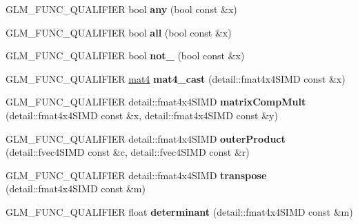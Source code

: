\begin{DoxyCompactItemize}
\item 
G\+L\+M\+\_\+\+F\+U\+N\+C\+\_\+\+Q\+U\+A\+L\+I\+F\+I\+ER bool {\bfseries any} (bool const \&x)\hypertarget{namespaceglm_ad41a7e46efe59ecfa701a0d561b7e8fa}{}\label{namespaceglm_ad41a7e46efe59ecfa701a0d561b7e8fa}

\item 
G\+L\+M\+\_\+\+F\+U\+N\+C\+\_\+\+Q\+U\+A\+L\+I\+F\+I\+ER bool {\bfseries all} (bool const \&x)\hypertarget{namespaceglm_a55c4531f4a0de48f87a20702d96d4289}{}\label{namespaceglm_a55c4531f4a0de48f87a20702d96d4289}

\item 
G\+L\+M\+\_\+\+F\+U\+N\+C\+\_\+\+Q\+U\+A\+L\+I\+F\+I\+ER bool {\bfseries not\+\_\+} (bool const \&x)\hypertarget{namespaceglm_a081b70b3c919d22f18bb04e6f9c3b7ca}{}\label{namespaceglm_a081b70b3c919d22f18bb04e6f9c3b7ca}

\item 
G\+L\+M\+\_\+\+F\+U\+N\+C\+\_\+\+Q\+U\+A\+L\+I\+F\+I\+ER \hyperlink{group__core__types_ga7dcd2365c2e368e6af5b7adeb6a9c8df}{mat4} {\bfseries mat4\+\_\+cast} (detail\+::fmat4x4\+S\+I\+MD const \&x)\hypertarget{namespaceglm_aaea24a8e252f68832f4d368be2035889}{}\label{namespaceglm_aaea24a8e252f68832f4d368be2035889}

\item 
G\+L\+M\+\_\+\+F\+U\+N\+C\+\_\+\+Q\+U\+A\+L\+I\+F\+I\+ER detail\+::fmat4x4\+S\+I\+MD {\bfseries matrix\+Comp\+Mult} (detail\+::fmat4x4\+S\+I\+MD const \&x, detail\+::fmat4x4\+S\+I\+MD const \&y)\hypertarget{namespaceglm_a3f8b69f9fddfae106e1a18ad66a17a1a}{}\label{namespaceglm_a3f8b69f9fddfae106e1a18ad66a17a1a}

\item 
G\+L\+M\+\_\+\+F\+U\+N\+C\+\_\+\+Q\+U\+A\+L\+I\+F\+I\+ER detail\+::fmat4x4\+S\+I\+MD {\bfseries outer\+Product} (detail\+::fvec4\+S\+I\+MD const \&c, detail\+::fvec4\+S\+I\+MD const \&r)\hypertarget{namespaceglm_a24beb25b08989724431540bb9279937c}{}\label{namespaceglm_a24beb25b08989724431540bb9279937c}

\item 
G\+L\+M\+\_\+\+F\+U\+N\+C\+\_\+\+Q\+U\+A\+L\+I\+F\+I\+ER detail\+::fmat4x4\+S\+I\+MD {\bfseries transpose} (detail\+::fmat4x4\+S\+I\+MD const \&m)\hypertarget{namespaceglm_a8a85a6f79193f0789bd2ed17802b70f6}{}\label{namespaceglm_a8a85a6f79193f0789bd2ed17802b70f6}

\item 
G\+L\+M\+\_\+\+F\+U\+N\+C\+\_\+\+Q\+U\+A\+L\+I\+F\+I\+ER float {\bfseries determinant} (detail\+::fmat4x4\+S\+I\+MD const \&m)\hypertarget{namespaceglm_a3d33b661dfd45c27b41440cd02605c05}{}\label{namespaceglm_a3d33b661dfd45c27b41440cd02605c05}


\end{DoxyCompactItemize}
